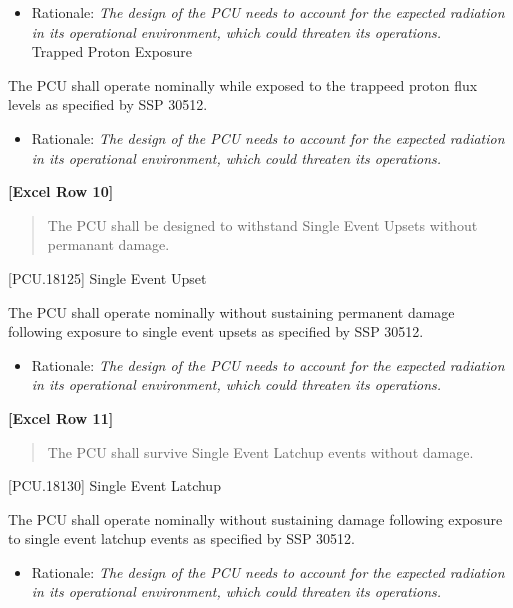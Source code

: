 \begin{itemize}
\item{} Rationale: \emph{The design of the PCU needs to account for the expected radiation in its operational environment, which could threaten its operations.}\\
[PCU.18120] Trapped Proton Exposure

\end{itemize}

The PCU shall operate nominally while exposed to the trappeed proton flux levels as specified by SSP 30512.

\begin{itemize}
\item{} Rationale: \emph{The design of the PCU needs to account for the expected radiation in its operational environment, which could threaten its operations.}

\end{itemize}

\textbf{[Excel Row 10]}

\begin{quote}
The PCU shall be designed to withstand Single Event Upsets without permanant damage.
\end{quote}

[PCU.18125] Single Event Upset

The PCU shall operate nominally without sustaining permanent damage following exposure to single event upsets as specified by SSP 30512.

\begin{itemize}
\item{} Rationale: \emph{The design of the PCU needs to account for the expected radiation in its operational environment, which could threaten its operations.}

\end{itemize}

\textbf{[Excel Row 11]}

\begin{quote}
The PCU shall survive Single Event Latchup events without damage.
\end{quote}

[PCU.18130] Single Event Latchup

The PCU shall operate nominally without sustaining damage following exposure to single event latchup events as specified by SSP 30512.

\begin{itemize}
\item{} Rationale: \emph{The design of the PCU needs to account for the expected radiation in its operational environment, which could threaten its operations.}

\end{itemize}

